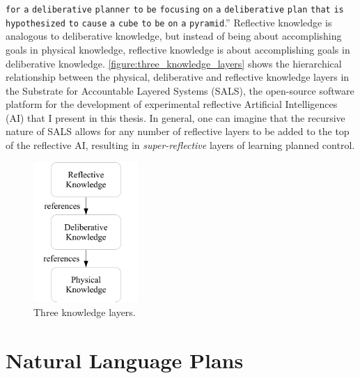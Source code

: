 {\tt{for}} {\tt{a}} {\tt{deliberative}} {\tt{planner}} {\tt{to}}
{\tt{be}} {\tt{focusing}} {\tt{on}} {\tt{a}} {\tt{deliberative}}
{\tt{plan}} {\tt{that}} {\tt{is}} {\tt{hypothesized}} {\tt{to}}
{\tt{cause}} {\tt{a}} {\tt{cube}} {\tt{to}} {\tt{be}} {\tt{on}}
{\tt{a}} {\tt{pyramid}}.''  Reflective knowledge is analogous to
deliberative knowledge, but instead of being about accomplishing goals
in physical knowledge, reflective knowledge is about accomplishing
goals in deliberative knowledge.
{\autoref{figure:three_knowledge_layers}} shows the hierarchical
relationship between the physical, deliberative and reflective
knowledge layers in the Substrate for Accountable Layered Systems
(SALS), the open-source software platform for the development of
experimental reflective Artificial Intelligences (AI) that I present
in this thesis.  In general, one can imagine that the recursive nature
of SALS allows for any number of reflective layers to be added to the
top of the reflective AI, resulting in \emph{super-reflective} layers
of learning planned control.
\begin{figure}
  \center
  \includegraphics[width=4cm]{gfx/three_knowledge_layers}
  \caption{Three knowledge layers.}
  \label{figure:three_knowledge_layers}
\end{figure}

\section{Natural Language Plans}

